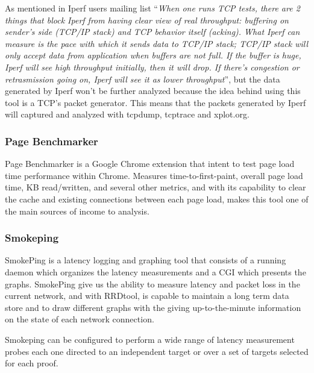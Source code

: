 As mentioned in Iperf users mailing list ``\textit{When one runs TCP tests,
there are 2 things that block Iperf from having clear view of real throughput:
buffering on sender's side (TCP/IP stack) and TCP behavior itself (acking).
What Iperf can measure is the pace with which it sends data to TCP/IP stack;
TCP/IP stack will only accept data from application when buffers are not full.
If the buffer is huge, Iperf will see high throughput initially, then it will
drop. If there's congestion or retrasmission going on, Iperf will see it as
lower throughput}''\cite{iperfmaillist}, but the data generated by Iperf won't
be further analyzed because the  idea behind using this tool is a TCP's packet
generator. This means that the packets generated by  Iperf will captured and
analyzed with tcpdump, tcptrace and xplot.org.

\subsubsection{Page Benchmarker}
Page Benchmarker is a Google Chrome extension that intent to test page load 
time performance within Chrome. Measures time-to-first-paint, overall page load 
time, KB read/written, and several other metrics, and with its capability to 
clear the cache and existing connections between each page load, makes this 
tool one of the main sources of income to analysis.

\subsubsection{Smokeping}
SmokePing is a latency logging and graphing tool that consists of a running 
daemon which organizes the latency measurements and a CGI which presents the 
graphs. SmokePing give us the ability to measure latency and packet loss 
in the current network, and with RRDtool, is capable to maintain a long term 
data store and to draw different graphs with the giving up-to-the-minute 
information on the state of each network connection.

Smokeping can be configured to perform a wide range of latency measurement 
probes each one directed to an independent target or over a set of targets 
selected for each proof.
